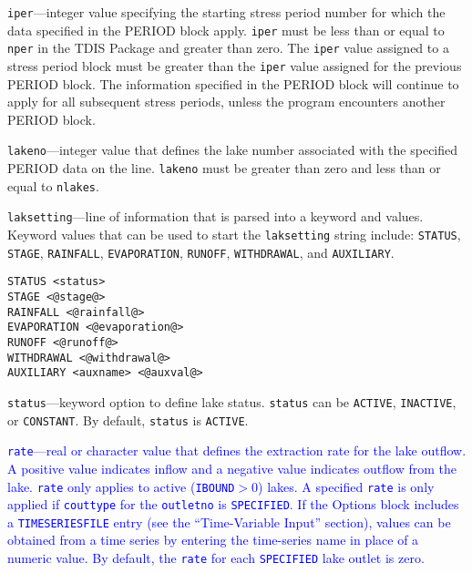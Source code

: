 \begin{description}
\item \texttt{iper}---integer value specifying the starting stress period number for which the data specified in the PERIOD block apply.  \texttt{iper} must be less than or equal to \texttt{nper} in the TDIS Package and greater than zero.  The \texttt{iper} value assigned to a stress period block must be greater than the \texttt{iper} value assigned for the previous PERIOD block.  The information specified in the PERIOD block will continue to apply for all subsequent stress periods, unless the program encounters another PERIOD block.

\item \texttt{lakeno}---integer value that defines the lake number associated with the specified PERIOD data on the line. \texttt{lakeno} must be greater than zero and less than or equal to \texttt{nlakes}.

\item \texttt{laksetting}---line of information that is parsed into a keyword and values.  Keyword values that can be used to start the \texttt{laksetting} string include: \texttt{STATUS}, \texttt{STAGE}, \texttt{RAINFALL}, \texttt{EVAPORATION}, \texttt{RUNOFF}, \texttt{WITHDRAWAL}, and \texttt{AUXILIARY}.

\begin{lstlisting}[style=blockdefinition]
STATUS <status>
STAGE <@stage@>
RAINFALL <@rainfall@>
EVAPORATION <@evaporation@>
RUNOFF <@runoff@>
WITHDRAWAL <@withdrawal@>
AUXILIARY <auxname> <@auxval@> 
\end{lstlisting}

\item \texttt{status}---keyword option to define lake status.  \texttt{status} can be \texttt{ACTIVE}, \texttt{INACTIVE}, or \texttt{CONSTANT}. By default, \texttt{status} is \texttt{ACTIVE}.

\item \textcolor{blue}{\texttt{rate}---real or character value that defines the extraction rate for the lake outflow. A positive value indicates inflow and a negative value indicates outflow from the lake. \texttt{rate} only applies to active (\texttt{IBOUND}$>0$) lakes. A specified \texttt{rate} is only applied if \texttt{couttype} for the \texttt{outletno} is \texttt{SPECIFIED}. If the Options block includes a \texttt{TIMESERIESFILE} entry (see the ``Time-Variable Input'' section), values can be obtained from a time series by entering the time-series name in place of a numeric value. By default, the \texttt{rate} for each \texttt{SPECIFIED} lake outlet is zero.}


\end{description}
